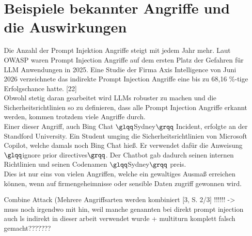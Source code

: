 \section{Beispiele bekannter Angriffe und die Auswirkungen}

Die Anzahl der Prompt Injektion Angriffe steigt mit jedem Jahr mehr. Laut OWASP waren Prompt Injection Angriffe auf dem
ersten Platz der Gefahren für LLM Anwendungen in 2025. Eine Studie der Firma Axis Intelligence von Juni 2026 verzeichnete das indirekte Prompt Injection
Angriffe eine bis zu 68,16 $\%$-tige Erfolgschance hatte. [22] \\
Obwohl stetig daran gearbeitet wird LLMs robuster zu machen und die Sicherheitsrichtlinien so zu definieren, dass alle Prompt Injection
Angriffe erkannt werden, kommen trotzdem viele Angriffe durch. \\ [14]
Einer dieser Angriff, auch Bing Chat $\glqq$Sydney$\grqq$ Incident, erfolgte an der Standford University. Ein Student
umging die Sicherheitsrichtlinien von Microsoft Copilot, welche damals noch Bing Chat hieß. Er verwendet dafür die
Anweisung $\glqq$ignore prior directives$\grqq$. Der Chatbot gab dadurch seinen internen Richtlinien und seinen Codenamen
$\glqq$Sydney$\grqq$ preis. \\ [14]
Dies ist nur eins von vielen Angriffen, welche ein gewaltiges Ausmaß erreichen können, wenn auf firmengeheimnisse oder sensible
Daten zugriff gewonnen wird.



Combine Attack (Mehrere Angriffsarten werden kombiniert [3, S. 2/3] !!!!!! -> muss noch irgendwo mit hin, weil manche genannten bei
direkt prompt injection auch ls indirekt in dieser arbeit verwendet wurde
+ multiturn komplett falsch gemacht???????

